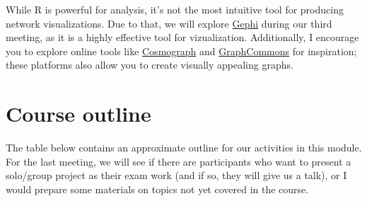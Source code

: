 \documentclass[
]{book}
\begin{document}
While R is powerful for analysis, it's not the most intuitive tool for producing network visualizations. Due to that, we will explore \href{https://gephi.org/}{Gephi} during our third meeting, as it is a highly effective tool for vizualization. Additionally, I encourage you to explore online tools like \href{https://cosmograph.app/}{Cosmograph} and \href{https://graphcommons.com/}{GraphCommons} for inspiration; these platforms also allow you to create visually appealing graphs.

\chapter*{\texorpdfstring{\textbf{Course outline}}{Course outline}}\label{course-outline}

The table below contains an approximate outline for our activities in this module. For the last meeting, we will see if there are participants who want to present a solo/group project as their exam work (and if so, they will give us a talk), or I would prepare some materials on topics not yet covered in the course.
\end{document}
